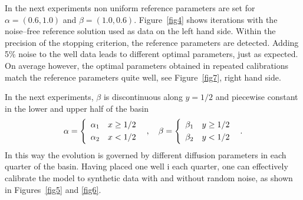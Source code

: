 In the next experiments non uniform reference parameters are set for 
$\alpha = (0.6, 1.0)$ and $\beta = (1.0, 0.6)$.
Figure~\ref{fig4} shows iterations with the noise--free reference solution used as data on the left hand side.
Within the precision of the stopping criterion, the reference parameters are detected.
Adding 5\% noise to the well data leads to different optimal parameters, just as expected.
On average however, the optimal parameters obtained in repeated calibrations match the reference parameters quite well,
see Figure~\ref{fig7}, right hand side.

In the next experiments, $\beta$ is discontinuous along $y=1/2$ 
and piecewise constant in the lower and upper half of the basin
$$
 \alpha = \left\{
 \begin{array}{rl} \alpha_1 & x \ge 1/2 \\[\jot] \alpha_2 & x < 1/2 \end{array}
 \right .
 \enspace , \quad
 \beta = \left\{
 \begin{array}{rl} \beta_1 & y \ge 1/2 \\[\jot] \beta_2 & y < 1/2 \end{array}
 \right .
 \enspace .
$$
In this way the evolution is governed by different diffusion parameters
in each quarter of the basin.
Having placed one well i each quarter, 
one can effectively calibrate the model to synthetic data with and without random noise, 
as shown in Figures~\ref{fig5} and \ref{fig6}.

